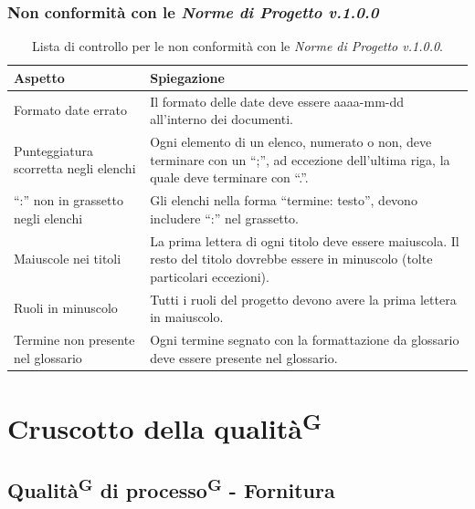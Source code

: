 \documentclass[8pt]{article}
\newcommand{\glossterm}[1]{#1\textsuperscript{G}} %
\begin{document}
\subsubsection{Non conformità con le \textit{Norme di Progetto v.1.0.0}}
\renewcommand{\arraystretch}{2.5}
\begin{longtable}{|>{\centering}p{5cm}|>{\centering\arraybackslash}p{10cm}|}
\hline
\rowcolor{white}
    \textbf{Aspetto} & \textbf{Spiegazione} \\
\hline
\endfirsthead
\rowcolor{white}
    \caption{Lista di controllo per le non conformità con le \textit {Norme di Progetto v.1.0.0}.}
    \label{table: Lista di controllo per le non conformità con le Norme di Progetto}
\endlastfoot
    Formato date errato & Il formato delle date deve essere aaaa-mm-dd all'interno dei documenti. \\
    \hline
    Punteggiatura scorretta negli elenchi &  Ogni elemento di un elenco, numerato o non, deve terminare con un ``;”, ad eccezione dell'ultima riga, la quale deve terminare con ``.”. \\ 
    \hline
    ``:” non in grassetto negli elenchi & Gli elenchi nella forma ``termine: testo”, devono
    includere ``:” nel grassetto. \\
    \hline
    Maiuscole nei titoli & La prima lettera di ogni titolo deve essere maiuscola. Il resto del
    titolo dovrebbe essere in minuscolo (tolte particolari eccezioni). \\
    \hline
    Ruoli in minuscolo & Tutti i ruoli del progetto devono avere la prima lettera in maiuscolo. \\
    \hline
    Termine non presente nel glossario & Ogni termine segnato con la formattazione da glossario deve essere presente nel glossario. \\
\hline
\end{longtable}
\newpage
\section{Cruscotto della \glossterm{qualità}}\label{sec:cruscotto della qualita}
\subsection{\glossterm{Qualità} di \glossterm{processo} - Fornitura}
\end{document}
